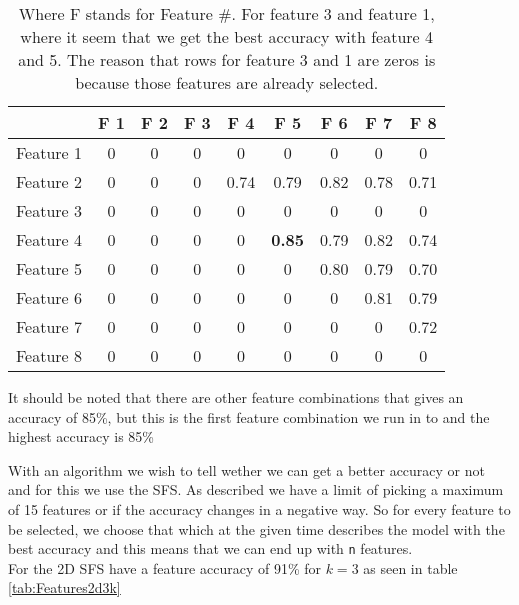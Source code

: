 \begin{table}[H]
  \centering
    \begin{tabular}{|c|c|c|c|c|c|c|c|c|}
    \hline
               &F 1 &F 2 &F 3 &F 4 &F 5 &F 6 &F 7 &F 8   \\ \hline
     Feature 1&        0 &        0 &        0 &        0 &        0 &        0 &        0 &        0   \\ \hline
     Feature 2&        0 &        0 &        0 &   0.74 &   0.79 &   0.82 &   0.78 &   0.71   \\ \hline
     Feature 3&        0 &        0 &        0 &        0 &        0 &        0 &        0 &       0   \\ \hline
     Feature 4&        0 &        0 &        0 &        0 &   \textbf{0.85} &   0.79 &   0.82 &  0.74   \\ \hline
     Feature 5&        0 &        0 &        0 &        0 &        0 &   0.80 &   0.79 &  0.70   \\ \hline
     Feature 6&        0 &        0 &        0 &        0 &        0 &        0 &   0.81 &   0.79   \\ \hline
     Feature 7&        0 &        0 &        0 &        0 &        0 &         0&        0 &   0.72   \\ \hline
     Feature 8&        0 &        0 &        0 &        0 &        0 &         0 &       0 &       0   \\
    \hline
    \end{tabular}%
  \caption{Where F stands for Feature \#. For feature 3 and feature 1, where it seem that we get the best accuracy with feature 4 and 5. The reason that rows for feature 3 and 1 are zeros is because those features are already selected.}\label{tab:AccuracyTable}%
\end{table}%

It should be noted that there are other feature combinations that gives an accuracy of 85\%, but this is the first feature combination we run in to and the highest accuracy is 85\%

With an algorithm we wish to tell wether we can get a better accuracy or not and for this we use the SFS. As described we have a limit of picking a maximum of 15 features or if the accuracy changes in a negative way. So for every feature to be selected, we choose that which at the given time describes the model with the best accuracy and this means that we can end up with \texttt{n} features.\\
For the 2D SFS have a feature accuracy of 91\% for $k=3$ as seen in table \ref{tab:Features2d3k}

